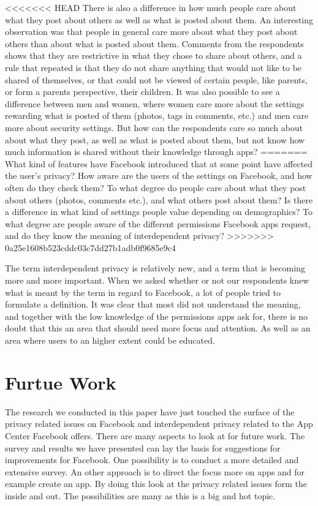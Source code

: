 <<<<<<< HEAD
There is also a difference in how much people care about what they post about others as well as what is posted about them. An interesting observation was that people in general care more about what they post about others than about what is posted about them. Comments from the respondents shows that they are restrictive in what they chose to share about others, and a rule that repeated is that they do not share anything that would not like to be shared of themselves, or that could not be viewed of certain people, like parents, or form a parents perspective, their children. It was also possible to see a difference between men and women, where women care more about the settings rewarding what is posted of them (photos, tags in comments, etc.) and men care more about security settings. 
But how can the respondents care so much about about what they post, as well as what is posted about them, but not know how much information is shared without their knowledge through apps? 
=======
What kind of features have Facebook introduced that at some point have affected the user's privacy?
How aware are the users of the settings on Facebook, and how often do they check them?
To what degree do people care about what they post about others (photos, comments etc.), and what others post about them? 
Is there a difference in what kind of settings people value depending on  demographics?
To what degree are people aware of the different permissions Facebook apps request, and do they know the meaning of interdependent privacy?
>>>>>>> 0a25e1608b523cddc03c7dd27b1adb0f9685e9c4


The term interdependent privacy is relatively new, and a term that is becoming more and more important. When we asked whether or not our respondents knew what is meant by the term in regard to Facebook, a lot of people tried to formulate a definition. It was clear that most did not understand the meaning, and together with the low knowledge of the permissions apps ask for, there is no doubt that this an area that should need more focus and attention. As well as an area where users to an higher extent could be educated. 

\section{Furtue Work}
The research we conducted in this paper have just touched the surface of the privacy related issues on Facebook and interdependent privacy related to the App Center Facebook offers. There are many aspects to look at for future work. The survey and results we have presented can lay the basis for suggestions for improvements for Facebook. One possibility is to conduct a more detailed and extensive survey. An other approach is to direct the focus more on apps and for example create an app. By doing this look at the privacy related issues form the inside and out. The possibilities are many as this is a big and hot topic. 

